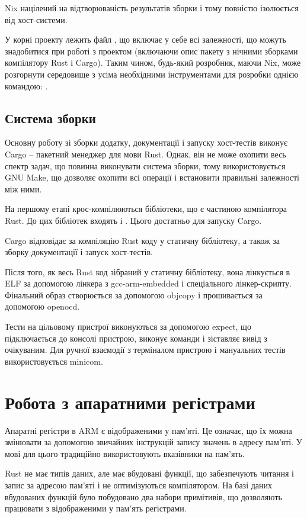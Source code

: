 \documentclass[main.tex]{subfiles}
\begin{document}
Nix націлений на відтворюваність результатів зборки і тому повністю ізолюється від хост-системи.

У корні проекту лежить файл , що включає у себе всі залежності, що можуть знадобитися при роботі з проектом (включаючи опис пакету з нічними зборками компілятору Rust і Cargo). Таким чином, будь-який розробник, маючи Nix, може розгорнути середовище з усіма необхідними інструментами для розробки однією командою: .

\subsection{Система зборки}

Основну роботу зі зборки додатку, документації і запуску хост-тестів виконує Cargo -- пакетний менеджер для мови Rust. Однак, він не може охопити весь спектр задач, що повинна виконувати система зборки, тому використовується GNU Make, що дозволяє охопити всі операції і встановити правильні залежності між ними.

На першому етапі крос-компілюються бібліотеки, що є частиною компілятора Rust. До цих бібліотек входять  і . Цього достатньо для запуску Cargo.

Cargo відповідає за компіляцію Rust коду у статичну бібліотеку, а також за зборку документації і запуск хост-тестів.

Після того, як весь Rust код зібраний у статичну бібліотеку, вона лінкується в \ac{ELF} за допомогою лінкера з gcc-arm-embedded і спеціального лінкер-скрипту. Фінальний образ створюється за допомогою objcopy і прошивається за допомогою openocd.

Тести на цільовому пристрої виконуються за допомогою expect, що підключається до консолі пристрою, виконує команди і зіставляє вивід з очікуваним. Для ручної взаємодії з терміналом пристрою і мануальних тестів використовується minicom.

\section{Робота з апаратними регістрами}

Апаратні регістри в ARM є відображеними у пам'яті. Це означає, що їх можна змінювати за допомогою звичайних інструкцій запису значень в адресу пам'яті. У мові \LangC{} для цього традиційно використовують вказівники на  пам'ять.

Rust не має  типів даних, але має вбудовані функції, що забезпечують читання і запис за адресою пам'яті і не оптимізуються компілятором. На базі даних вбудованих функцій було побудовано два набори примітивів, що дозволяють працювати з відображеними у пам'ять регістрами.
\end{document}
